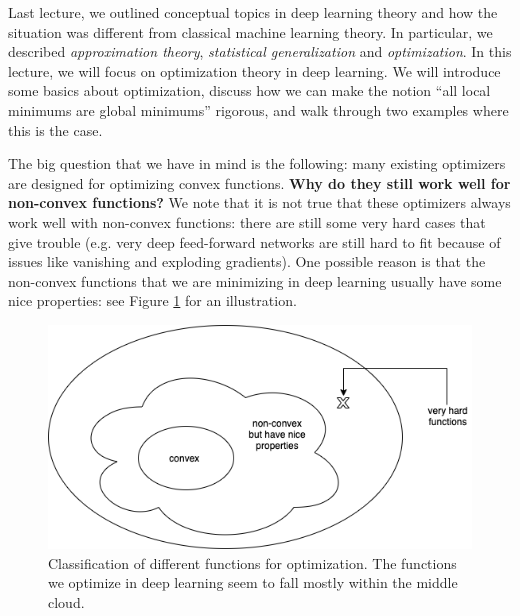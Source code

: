 \setcounter{section}{0}



Last lecture, we outlined conceptual topics in deep learning theory and how the situation was different from classical machine learning theory. In particular, we described \textit{approximation theory}, \textit{statistical generalization} and \textit{optimization}. In this lecture, we will focus on optimization theory in deep learning. We will introduce some basics about optimization, discuss how we can make the notion ``all local minimums are global minimums'' rigorous, and walk through two examples where this is the case.


The big question that we have in mind is the following: many existing optimizers are designed for optimizing convex functions. \textbf{Why do they still work well for non-convex functions?} We note that it is not true that these optimizers always work well with non-convex functions: there are still some very hard cases that give trouble (e.g. very deep feed-forward networks are still hard to fit because of issues like vanishing and exploding gradients). One possible reason is that the non-convex functions that we are minimizing in deep learning usually have some nice properties: see Figure \ref{lec10:fig:optimization} for an illustration.

\begin{figure}[H]
    \centering
    \includegraphics[scale = 0.5]{figures/landscape.png}
    \caption{Classification of different functions for optimization. The functions we optimize in deep learning seem to fall mostly within the middle cloud.}
    \label{lec10:fig:optimization}
\end{figure}


